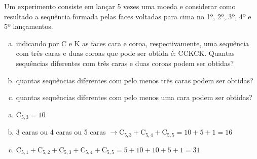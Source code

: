 \begin{ex}
Um experimento consiste em lançar 5 vezes uma moeda e considerar como resultado a sequência formada pelas faces voltadas para cima no 1º, 2º, 3º, 4º e 5º lançamentos.
   \begin{enumerate}[(a)]
   \item indicando por C e K as faces cara e coroa, respectivamente, uma sequência com três caras e duas coroas que pode ser obtida é: CCKCK. Quantas sequências diferentes com três caras e duas coroas podem ser obtidas?
   \item quantas sequências diferentes com pelo menos três caras podem ser obtidas?
   \item quantas sequências diferentes com pelo menos uma cara podem ser obtidas?
   \end{enumerate}
     \begin{sol}
       \phantom{A} 
        \begin{enumerate} [(a)]
            \item $\mathrm{C}_{5,3}=10$
            \item 3 caras ou 4 caras ou 5 caras $\rightarrow \mathrm{C}_{5,3}+\mathrm{C}_{5,4}+\mathrm{C}_{5,5}=10+5+1=16$
            \item $\mathrm{C}_{5,1}+\mathrm{C}_{5,2}+\mathrm{C}_{5,3}+\mathrm{C}_{5,4}+\mathrm{C}_{5,5}=5+10+10+5+1=31$
        \end{enumerate}
     \end{sol}
\end{ex}